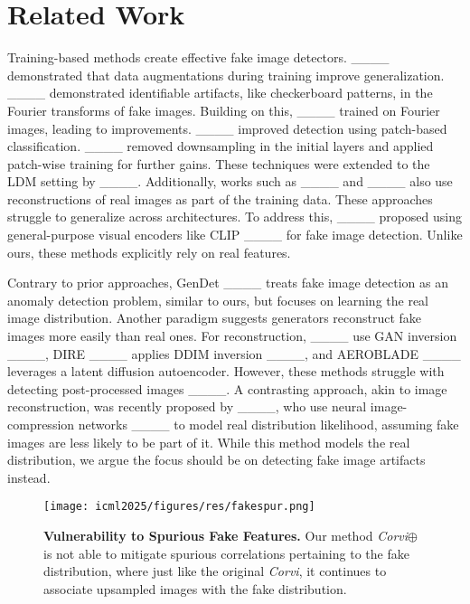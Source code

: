 \section{Related Work}
Training-based methods create effective fake image detectors. ____ demonstrated that data augmentations during training improve generalization. ____ demonstrated identifiable artifacts, like checkerboard patterns, in the Fourier transforms of fake images. Building on this, ____ trained on Fourier images, leading to improvements. ____ improved detection using patch-based classification. ____ removed downsampling in the initial layers and applied patch-wise training for further gains. These techniques were extended to the LDM setting by ____. Additionally, works such as ____ and ____ also use reconstructions of real images as part of the training data. These approaches struggle to generalize across architectures. To address this, ____ proposed using general-purpose visual encoders like CLIP ____ for fake image detection. Unlike ours, these methods explicitly rely on real features.


Contrary to prior approaches, GenDet ____ treats fake image detection as an anomaly detection problem, similar to ours, but focuses on learning the real image distribution. Another paradigm suggests generators reconstruct fake images more easily than real ones. For reconstruction, ____ use GAN inversion ____, DIRE ____ applies DDIM inversion ____, and AEROBLADE ____ leverages a latent diffusion autoencoder. However, these methods struggle with detecting post-processed images ____. A contrasting approach, akin to image reconstruction, was recently proposed by ____, who use neural image-compression networks ____ to model real distribution likelihood, assuming fake images are less likely to be part of it. While this method models the real distribution, we argue the focus should be on detecting fake image artifacts instead.
\begin{figure}[t]
\begin{center}
\centerline{\texttt{[image: icml2025/figures/res/fakespur.png]}}

\caption{\textbf{Vulnerability to Spurious Fake Features.} Our method \emph{Corvi$\oplus$} is not able to mitigate spurious correlations pertaining to the fake distribution, where just like the original \emph{Corvi}, it continues to associate upsampled images with the fake distribution.}
\label{fig:corvi-fakespur}
\end{center}
\vskip -0.28in
\end{figure}